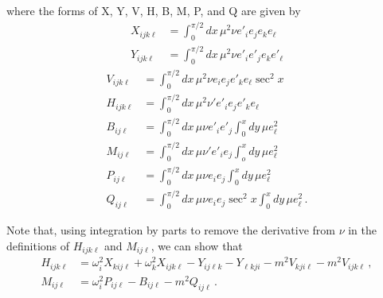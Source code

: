 \documentclass[letterpaper,11pt]{article}
\newcommand{\oi}{\omega_i}
\newcommand{\ok}{\omega_k}
\begin{document}
where the forms of X, Y, V, H, B, M, P, and Q are given by
\begin{align}
X_{ijk\ell} &= \int^{\pi/2}_0 dx \, \mu^2 \nu e'_i e_j e_k e_\ell \\
Y_{ijk\ell} &= \int^{\pi/2}_0 dx \, \mu^2 \nu e'_i e'_j e_k e'_\ell
\end{align}
\begin{align}
V_{ijk\ell} &= \int^{\pi/2}_0 dx \, \mu^2 \nu e_i e_j e'_k e_\ell \sec^2 x \\
H_{ijk\ell} &= \int^{\pi/2}_0 dx \, \mu^2 \nu' e'_i e_j e'_k e_\ell \\
B_{ij\ell} &= \int^{\pi/2}_0 dx \, \mu \nu e'_i e'_j \int^x_0 dy \, \mu e^2_\ell \\
M_{ij\ell} &= \int^{\pi/2}_0 dx \, \mu \nu' e'_i e_j \int^x_o dy \, \mu e_\ell^2 \\
P_{ij\ell} &= \int^{\pi/2}_0 dx \, \mu \nu e_i e_j \int^x_0 dy \, \mu e^2_\ell \\
Q_{ij\ell} &= \int^{\pi/2}_0 dx \, \mu \nu e_i e_j \sec^2 x \int^x_0 dy \, \mu e^2_\ell \, .
\end{align}

Note that, using integration by parts to remove the derivative from $\nu$ in the definitions of $H_{ijk\ell}$ and $M_{ij\ell}$, we can show that
\begin{align}
H_{ijk\ell} &= \oi^2 X_{kij\ell} + \ok^2 X_{ijk\ell} - Y_{ij\ell k}  - Y_{\ell kji}   - m^2 V_{kji\ell} -m^2 V_{ijk\ell} \, , \\
M_{ij\ell} &= \oi^2 P_{ij\ell} - B_{ij\ell} -m^2 Q_{ij\ell} \, .
\end{align}
\end{document}
